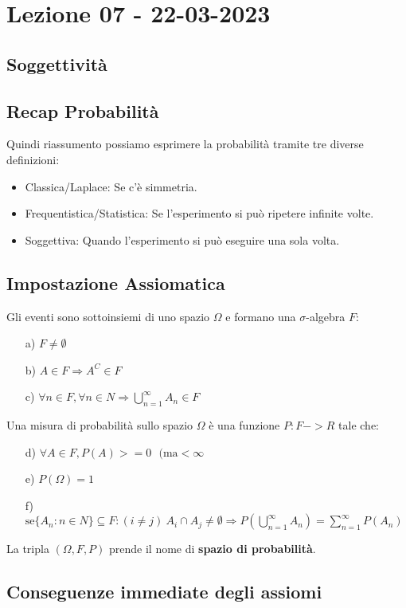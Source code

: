 \section{Lezione 07 - 22-03-2023}

\subsection{Soggettività}

\subsection{Recap Probabilità}
Quindi riassumento possiamo esprimere la probabilità tramite tre diverse definizioni:
\begin{itemize}
\item Classica/Laplace: Se c'è simmetria.
\item Frequentistica/Statistica: Se l'esperimento si può ripetere infinite volte.
\item Soggettiva: Quando l'esperimento si può eseguire una sola volta.
\end{itemize}

\subsection{Impostazione Assiomatica}
Gli eventi sono sottoinsiemi di uno spazio $\Omega$ e formano una $\sigma$-algebra $F$:
\begin{itemize}
\item[a)] $ F \neq \emptyset$
\item[b)] $ A \in F \Rightarrow A^C \in F $
\item[c)] $ \forall n \in F, \forall n \in N \Rightarrow \bigcup_{n=1}^{\infty} A_n \in F $
\end{itemize}
Una misura di probabilità sullo spazio $\Omega$ è una funzione $P: F -> R$ tale che:
\begin{itemize}
\item[d)] $\forall A \in F, P(A) >= 0 \:\:\: (\text{ma} < \infty$
\item[e)] $ P(\Omega) = 1 $
\item[f)] $ \text{se} \{A_n: n \in N \} \subseteq F: (i \neq j ) \: A_i \cap A_j \neq \emptyset \Rightarrow P(\bigcup_{n=1}^{\infty}A_n) = \sum_{n=1}^{\infty}P(A_n)$
\end{itemize}
La tripla $(\Omega, F, P)$ prende il nome di \textbf{spazio di probabilità}.

\subsection{Conseguenze immediate degli assiomi}
